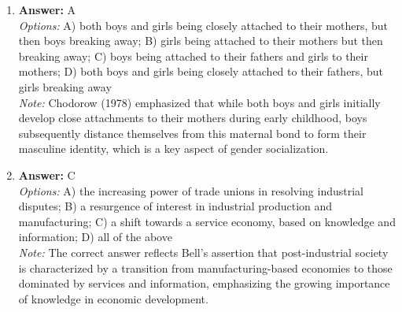 \documentclass[12pt]{article}
\begin{document}
\begin{enumerate}[label=\arabic*.]
\item \textbf{Answer:} A
\\ \textit{Options:} A) both boys and girls being closely attached to their mothers, but then boys breaking away; B) girls being attached to their mothers but then breaking away; C) boys being attached to their fathers and girls to their mothers; D) both boys and girls being closely attached to their fathers, but girls breaking away
\\ \textit{Note:} Chodorow (1978) emphasized that while both boys and girls initially develop close attachments to their mothers during early childhood, boys subsequently distance themselves from this maternal bond to form their masculine identity, which is a key aspect of gender socialization.
\item \textbf{Answer:} C
\\ \textit{Options:} A) the increasing power of trade unions in resolving industrial disputes; B) a resurgence of interest in industrial production and manufacturing; C) a shift towards a service economy, based on knowledge and information; D) all of the above
\\ \textit{Note:} The correct answer reflects Bell's assertion that post-industrial society is characterized by a transition from manufacturing-based economies to those dominated by services and information, emphasizing the growing importance of knowledge in economic development.
\end{enumerate}
\end{document}
